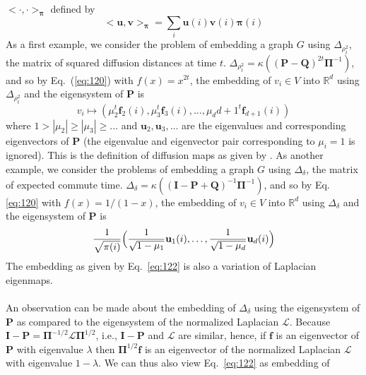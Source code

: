 $<\cdot,\cdot>_{\bm{\pi}}$ defined by
\begin{equation}
  \label{eq:121}
  <\mathbf{u},\mathbf{v}>_{\bm{\pi}} =
  \sum_{i}{\mathbf{u}(i)\mathbf{v}(i) \bm{\pi}(i)}
\end{equation}
As a first example, we consider the problem of embedding a graph $G$
using $\Delta_{\rho_t^2}$, the matrix of squared diffusion distances
at time $t$. $\Delta_{\rho_t^2} = \kappa((\mathbf{P} -
\mathbf{Q})^{2t} \bm{\Pi}^{-1})$, and so by Eq.~(\ref{eq:120}) with
$f(x) = x^{2t}$, the embedding of $v_i \in V$ into $\mathbb{R}^{d}$
using $\Delta_{\rho_t^2}$ and the eigensystem of $\mathbf{P}$ is  
\begin{equation}
  \label{eq:124}
  v_i \mapsto (\mu_{2}^{t} \mathbf{f}_{2}(i), \mu_{3}^{t}
  \mathbf{f}_{3}(i), \dots, \mu_d{d+1}^{t} \mathbf{f}_{d+1}(i))
\end{equation}
where $1 > |\mu_2| \geq |\mu_3| \geq \dots$ and
$\mathbf{u}_2, \mathbf{u}_3, \dots$ are the eigenvalues and
corresponding eigenvectors of $\mathbf{P}$ (the eigenvalue and
eigenvector pair corresponding to $\mu_i = 1$ is ignored). This is the
definition of diffusion maps as given by
\citet{coifman06:_diffus_maps}.  As another example, we consider the
problems of embedding a graph $G$ using $\Delta_\delta$, the matrix of
expected commute time.  $\Delta_\delta = \kappa((\mathbf{I} -
\mathbf{P} + \mathbf{Q})^{-1}\bm{\Pi}^{-1})$, and so by
Eq.\eqref{eq:120} with $f(x) = 1/(1-x)$, the embedding of $v_i \in V$
into $\mathbb{R}^{d}$ using $\Delta_\delta$ and the eigensystem of
$\mathbf{P}$ is
\begin{equation}
  \label{eq:122}
   \frac{1}{\sqrt{\pi(i)}} \Bigl(\frac{1}{\sqrt{1 - \mu_1}} \mathbf{u}_1(i),
    \dots, \frac{1}{\sqrt{1 - \mu_d}} \mathbf{u}_{d}(i)\Bigr)
\end{equation}
The embedding as given by Eq.~\eqref{eq:122} is also a variation of
Laplacian eigenmaps. \\ \\
\noindent
An observation can be made about the embedding of $\Delta_{\delta}$
using the eigensystem of $\mathbf{P}$ as compared to the eigensystem
of the normalized Laplacian $\bm{\mathcal{L}}$. Because $\mathbf{I} -
\mathbf{P} = \bm{\Pi}^{-1/2}\bm{\mathcal{L}}\bm{\Pi}^{1/2}$, i.e.,
$\mathbf{I} - \mathbf{P}$ and $\bm{\mathcal{L}}$ are similar, hence,
if $\mathbf{f}$ is an eigenvector of $\mathbf{P}$ with eigenvalue
$\lambda$ then $\bm{\Pi}^{1/2}\mathbf{f}$ is an eigenvector of the
normalized Laplacian $\bm{\mathcal{L}}$ with eigenvalue $1 -
\lambda$. We can thus also view Eq.~\eqref{eq:122} as embedding of
